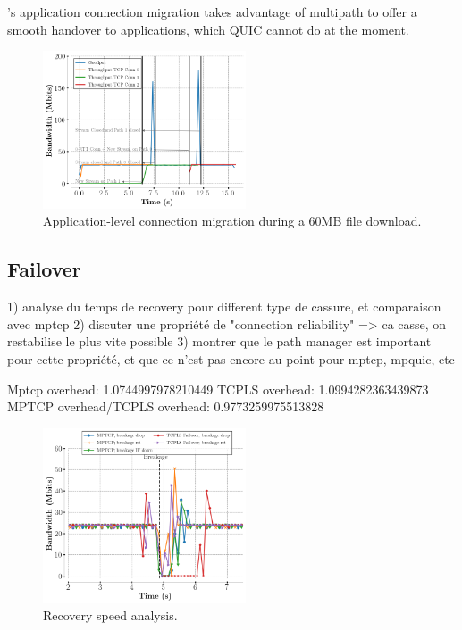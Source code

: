 \tcpls's application connection migration takes advantage of multipath to offer
a smooth handover to applications, which QUIC cannot do at the moment.

\begin{figure}[!t]
  \centering
  \includegraphics[width=6cm]{figures/migration.png}
  \caption{Application-level connection migration during a 60MB file download.}
  \label{fig:conn_migration}
\end{figure}

\subsection{Failover}

1) analyse du temps de recovery pour different type de cassure, et comparaison avec mptcp
2) discuter une propriété de "connection reliability" => ca casse, on restabilise le plus vite possible
3) montrer que le path manager est important pour cette propriété, et que ce n'est pas encore au point pour mptcp, mpquic, etc

Mptcp overhead: 1.0744997978210449
TCPLS overhead: 1.0994282363439873
MPTCP overhead/TCPLS overhead:              0.9773259975513828


\begin{figure}[!t]
  \begin{center}
    \includegraphics[width=6cm]{figures/breakage_analysis.png}
  \end{center}
  \caption{Recovery speed analysis.}
\end{figure}


